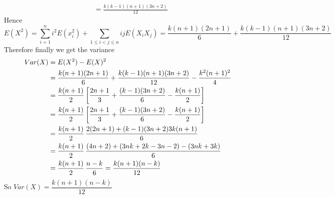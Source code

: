 \documentclass[a4paper, 11pt]{article}
\begin{document}
{\begin{align*}
		                                   & =\frac{k(k-1)(n+1)(3n+2)}{12}
	\end{align*}
	Hence$$E(X^2)=\sum_{i=1}^ni^2E(x_i^2)+\sum_{1\leq i<j\leq n}ijE(X_iX_j)=\frac{k(n+1)(2n+1)}{6}+\frac{k(k-1)(n+1)(3n+2)}{12}$$
	Therefore finally we get the variance\begin{align*}
		Var(X) &=E(X^2)-E(X)^2\\
		&=\frac{k(n+1)(2n+1)}{6}+\frac{k(k-1)(n+1)(3n+2)}{12}-\frac{k^2(n+1)^2}{4}\\
		&=\frac{k(n+1)}{2}\left[ \frac{2n+1}{3} +\frac{(k-1)(3n+2)}{6} -\frac{k(n+1)}{2} \right]\\
		&=\frac{k(n+1)}{2}\left[ \frac{2n+1}{3} +\frac{(k-1)(3n+2)}{6} -\frac{k(n+1)}{2} \right]\\
		&=\frac{k(n+1)}2 \,\frac{2(2n+1)+(k-1)(3n+2) 3k(n+1)}{6}\\
		&=\frac{k(n+1)}2 \,\frac{(4n+2)+(3nk+2k-3n-2) - (3nk+3k)}{6}\\
		&=\frac{k(n+1)}{2}\, \frac{n-k}{6}=\frac{k(n+1)(n-k)}{12}
	\end{align*}So $Var(X)=\dfrac{k(n+1)(n-k)}{12}$
	}
	
\end{document}
